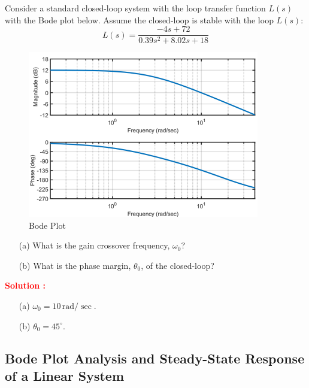 \documentclass[12pt]{article}
\begin{document}
Consider a standard closed-loop system with the loop transfer function $L(s)$ with the Bode plot below.  Assume the closed-loop is stable with the loop $L(s)$:
\begin{equation*}
    L(s) = \frac{-4s+72}{0.39s^2+8.02s+18}
\end{equation*}
\begin{figure}[h]
\centering
\includegraphics[width=0.9\textwidth]{figs/6.1.png}
\caption{Bode Plot}
\end{figure}
\begin{itemize}
    \item[(a)] What is the gain crossover frequency, $\omega_0$?
    \item[(b)] What is the phase margin, $\theta_0$, of the closed-loop? 
    \end{itemize}
\textbf{\textcolor{red}{Solution :}} \\
\begin{itemize}
    \item[(a)] $\omega_0 = 10\, \text{rad}/\sec.$
    \item[(b)] $\theta_0 = 45^{\circ}$.
\end{itemize}
\clearpage

\subsection{Bode Plot Analysis and Steady-State Response of a Linear System}
\end{document}
